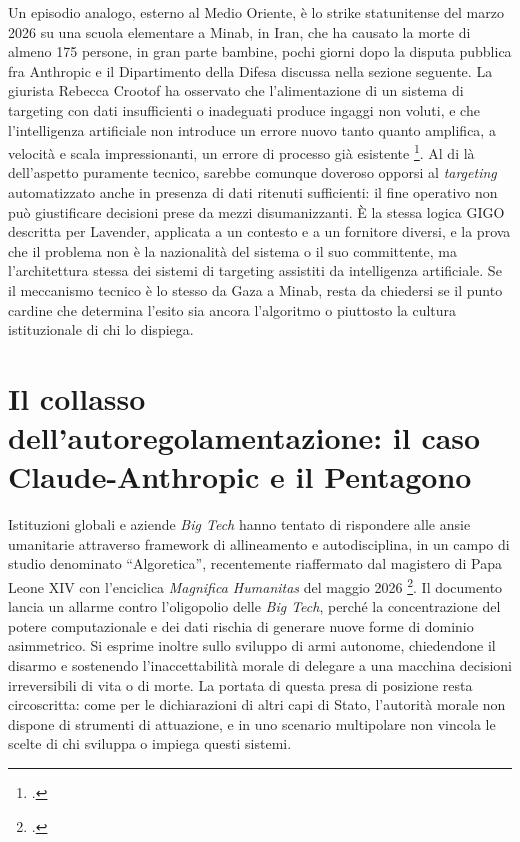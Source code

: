 \ifstampa\documentclass[a4paper,12pt,twoside,openright]{report}\else\documentclass[a4paper,12pt]{report}\fi
\newif\ifrevisione \revisionefalse
\DeclareRobustCommand{\rev}[1]{\ifrevisione{\color{blue!65!black}#1}\else#1\fi}
\begin{document}
Un episodio analogo, esterno al Medio Oriente, è lo strike statunitense del marzo
2026 su una scuola elementare a Minab, in Iran, che ha causato la morte di almeno
175 persone, in gran parte bambine, pochi giorni dopo la disputa pubblica fra
Anthropic e il Dipartimento della Difesa discussa nella sezione seguente. La
giurista Rebecca Crootof ha osservato che l'alimentazione di un sistema di
targeting con dati insufficienti o inadeguati produce ingaggi non voluti, e che
l'intelligenza artificiale non introduce un errore nuovo tanto quanto amplifica,
a velocità e scala impressionanti, un errore di processo già esistente
\footcite{crootof_2026}. Al di là dell'aspetto puramente tecnico, sarebbe
comunque doveroso opporsi al \textit{targeting} automatizzato anche in presenza
di dati ritenuti sufficienti: il fine operativo non può giustificare decisioni
prese da mezzi disumanizzanti. È la stessa logica GIGO descritta per Lavender,
applicata a un contesto e a un fornitore diversi, e la prova che il problema non
è la nazionalità del sistema o il suo committente, ma l'architettura stessa dei
sistemi di targeting assistiti da intelligenza artificiale. Se il meccanismo
tecnico è lo stesso da Gaza a Minab, resta da chiedersi se il punto cardine che
determina l'esito sia ancora l'algoritmo o piuttosto la cultura istituzionale di
chi lo dispiega.

\section{Il collasso dell'autoregolamentazione: il caso Claude-Anthropic e il Pentagono}
\label{sec:governance}

Istituzioni globali e aziende \textit{Big Tech} hanno tentato di rispondere alle
ansie umanitarie attraverso framework di allineamento e autodisciplina, in un
campo di studio denominato ``Algoretica'', recentemente riaffermato dal magistero
di Papa Leone XIV con l'enciclica \textit{Magnifica Humanitas} del maggio 2026
\footcite{enciclica_2026}. Il documento lancia un allarme contro l'oligopolio
delle \textit{Big Tech}, perché la concentrazione del potere computazionale e dei
dati rischia di generare nuove forme di dominio asimmetrico. \rev{Si esprime} inoltre sullo sviluppo di armi autonome, chiedendone il disarmo e
sostenendo l'inaccettabilità morale di delegare a una macchina decisioni
irreversibili di vita o di morte. La portata di questa presa di posizione resta
circoscritta: come per le dichiarazioni di altri capi di Stato, l'autorità
morale non dispone di strumenti di attuazione, e in uno scenario multipolare non
vincola le scelte di chi sviluppa o impiega questi sistemi.
\end{document}
